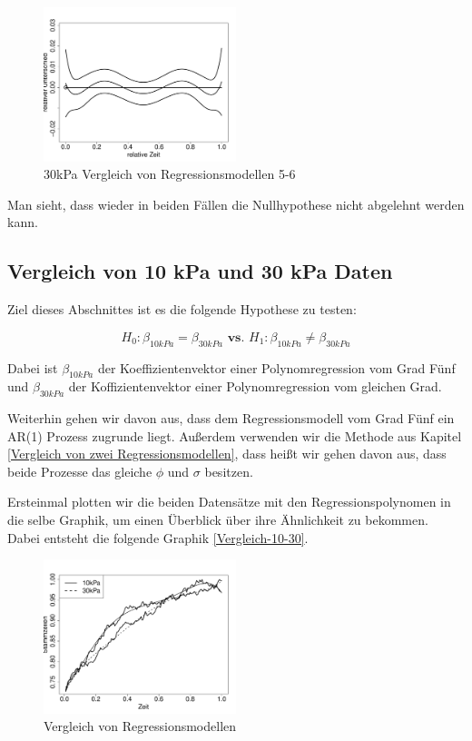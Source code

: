 \documentclass[12pt,a4paper]{article}
\theoremstyle{definition}
\theoremstyle{definition}
\theoremstyle{definition}
\theoremstyle{definition}
\begin{document}
\begin{figure}[H] 
  \centering
     \includegraphics[width=0.5\textwidth]{10kPa-poly-KB-5-6.pdf}
  \caption{30kPa Vergleich von Regressionsmodellen 5-6}
  \label{30kPa-Regmod-5-6}
\end{figure}

Man sieht, dass wieder in beiden Fällen die Nullhypothese nicht abgelehnt werden kann.


\subsection{Vergleich von 10 kPa und 30 kPa Daten}
Ziel dieses Abschnittes ist es die folgende Hypothese zu testen:

\begin{equation*}
H_0 : \beta_{10kPa} = \beta_{30kPa} \textbf{ vs. } H_1 : \beta_{10kPa} \neq \beta_{30kPa}
\end{equation*}

Dabei ist $\beta_{10kPa}$ der Koeffizientenvektor einer Polynomregression vom Grad Fünf und $\beta_{30kPa}$ der Koffizientenvektor einer Polynomregression vom gleichen Grad. 

Weiterhin gehen wir davon aus, dass dem Regressionsmodell vom Grad Fünf ein AR(1) Prozess zugrunde liegt. Außerdem verwenden wir die Methode aus Kapitel \ref{Vergleich von zwei Regressionsmodellen}, dass heißt wir gehen davon aus, dass beide Prozesse das gleiche $\phi$ und $\sigma$ besitzen.

Ersteinmal plotten wir die beiden Datensätze mit den Regressionspolynomen in die selbe Graphik, um einen Überblick über ihre Ähnlichkeit zu bekommen. Dabei entsteht die folgende Graphik \eqref{Vergleich-10-30}.


\begin{figure}[H] 
  \centering
     \includegraphics[width=0.5\textwidth]{Vergleich-10vs30-poly5}
  \caption{Vergleich von Regressionsmodellen}
  \label{Vergleich-10-30}
\end{figure}
\end{document}
